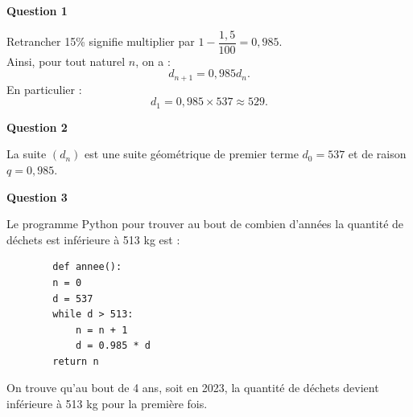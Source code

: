 \textbf{Question 1}
	
	Retrancher 15\% signifie multiplier par $1 - \dfrac{1,5}{100} = 0,985$.\\
	 Ainsi, pour tout naturel $n$, on a :
	\[
	d_{n+1} = 0,985 d_n.
	\]
	En particulier :
	\[
	d_1 = 0,985 \times 537 \approx 529.
	\]
	
	\textbf{Question 2}
	
	La suite $(d_n)$ est une suite géométrique de premier terme $d_0 = 537$ et de raison $q = 0,985$.
	
	\textbf{Question 3}
	
	Le programme Python pour trouver au bout de combien d'années la quantité de déchets est inférieure à 513 kg est :
	
	\begin{verbatim}
		def annee():
		n = 0
		d = 537
		while d > 513:
		    n = n + 1
		    d = 0.985 * d
		return n
	\end{verbatim}
	
	On trouve qu'au bout de 4 ans, soit en 2023, la quantité de déchets devient inférieure à 513 kg pour la première fois.
